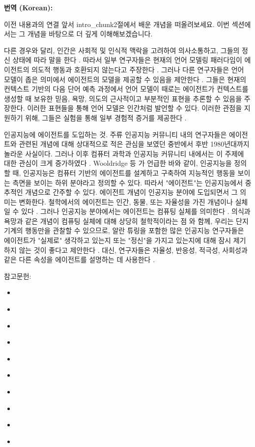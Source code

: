 \documentclass[12pt,a4paper]{article}
\begin{document}
\begin{mdframed}[style=ko]
\noindent\textbf{\small 번역 (Korean):}\\[2pt]
\begin{linkbox}{이전 내용과의 연결}
  앞서 intro_chunk2절에서 배운 개념을 떠올려보세요. 이번 섹션에서는 그 개념을 바탕으로 더 깊게 이해해보겠습니다.
\end{linkbox}
다른 경우와 달리, 인간은 사회적 및 인식적 맥락을 고려하여 의사소통하고, 그들의 정신 상태에 따라 말을 한다 \cite{43, 44}. 따라서 일부 연구자들은 현재의 언어 모델링 패러다임이 에이전트의 의도적 행동과 호환되지 않는다고 주장한다 \cite{30, 45}. 그러나 다른 연구자들은 언어 모델이 좁은 의미에서 에이전트의 모델을 제공할 수 있음을 제안한다 \cite{46, 47}. 그들은 현재의 컨텍스트 기반의 다음 단어 예측 과정에서 언어 모델이 때로는 에이전트가 컨텍스트를 생성할 때 보유한 믿음, 욕망, 의도의 근사적이고 부분적인 표현을 추론할 수 있음을 주장한다. 이러한 표현들을 통해 언어 모델은 인간처럼 발언할 수 있다. 이러한 관점을 지원하기 위해, 그들은 실험을 통해 일부 경험적 증거를 제공한다 \cite{46, 48, 49}.

인공지능에 에이전트를 도입하는 것. 주류 인공지능 커뮤니티 내의 연구자들은 에이전트와 관련된 개념에 대해 상대적으로 적은 관심을 보였던 중반에서 후반 1980년대까지 놀라운 사실이다. 그러나 이후 컴퓨터 과학과 인공지능 커뮤니티 내에서는 이 주제에 대한 관심이 크게 증가하였다 \cite{50, 51, 52, 53}. Wooldridge 등 \cite{4}가 언급한 바와 같이, 인공지능을 정의할 때, 인공지능은 컴퓨터 기반의 에이전트를 설계하고 구축하여 지능적인 행동을 보이는 측면을 보이는 하위 분야라고 정의할 수 있다. 따라서 "에이전트"는 인공지능에서 중추적인 개념으로 간주할 수 있다. 에이전트 개념이 인공지능 분야에 도입되면서 그 의미는 변화한다. 철학에서의 에이전트는 인간, 동물, 또는 자율성을 가진 개념이나 실체일 수 있다 \cite{5}. 그러나 인공지능 분야에서는 에이전트는 컴퓨팅 실체를 의미한다 \cite{4, 7}. 의식과 욕망과 같은 개념이 컴퓨팅 실체에 대해 상당히 철학적이라는 점 \cite{11}와 함께, 우리는 단지 기계의 행동만을 관찰할 수 있으므로, 알란 튜링을 포함한 많은 인공지능 연구자들은 에이전트가 "실제로" 생각하고 있는지 또는 "정신"을 가지고 있는지에 대해 잠시 제기하지 않는 것이 좋다고 제안한다 \cite{3}. 대신, 연구자들은 자율성, 반응성, 적극성, 사회성과 같은 다른 속성을 에이전트를 설명하는 데 사용한다 \cite{4, 9}.

참고문헌:
\begin{itemize}
    \item \cite{43, 44}
    \item \cite{30, 45}
    \item \cite{46, 47}
    \item \cite{46, 48, 49}
    \item \cite{50, 51, 52, 53}
    \item \cite{4}
    \item \cite{5}
    \item \cite{11}
    \item \cite{3}
    \item \cite{9}
\end{itemize}


\end{mdframed}
\end{document}
